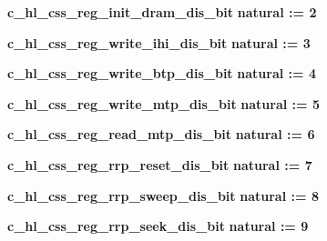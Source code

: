 \begin{DoxyCompactItemize}
\item 
{\bf c\+\_\+hl\+\_\+css\+\_\+reg\+\_\+init\+\_\+dram\+\_\+dis\+\_\+bit} {\bfseries \textcolor{comment}{natural}\textcolor{vhdlchar}{ }\textcolor{vhdlchar}{ }\textcolor{vhdlchar}{\+:}\textcolor{vhdlchar}{=}\textcolor{vhdlchar}{ }\textcolor{vhdlchar}{ } \textcolor{vhdldigit}{2} \textcolor{vhdlchar}{ }} 
\item 
{\bf c\+\_\+hl\+\_\+css\+\_\+reg\+\_\+write\+\_\+ihi\+\_\+dis\+\_\+bit} {\bfseries \textcolor{comment}{natural}\textcolor{vhdlchar}{ }\textcolor{vhdlchar}{ }\textcolor{vhdlchar}{\+:}\textcolor{vhdlchar}{=}\textcolor{vhdlchar}{ }\textcolor{vhdlchar}{ } \textcolor{vhdldigit}{3} \textcolor{vhdlchar}{ }} 
\item 
{\bf c\+\_\+hl\+\_\+css\+\_\+reg\+\_\+write\+\_\+btp\+\_\+dis\+\_\+bit} {\bfseries \textcolor{comment}{natural}\textcolor{vhdlchar}{ }\textcolor{vhdlchar}{ }\textcolor{vhdlchar}{\+:}\textcolor{vhdlchar}{=}\textcolor{vhdlchar}{ }\textcolor{vhdlchar}{ } \textcolor{vhdldigit}{4} \textcolor{vhdlchar}{ }} 
\item 
{\bf c\+\_\+hl\+\_\+css\+\_\+reg\+\_\+write\+\_\+mtp\+\_\+dis\+\_\+bit} {\bfseries \textcolor{comment}{natural}\textcolor{vhdlchar}{ }\textcolor{vhdlchar}{ }\textcolor{vhdlchar}{\+:}\textcolor{vhdlchar}{=}\textcolor{vhdlchar}{ }\textcolor{vhdlchar}{ } \textcolor{vhdldigit}{5} \textcolor{vhdlchar}{ }} 
\item 
{\bf c\+\_\+hl\+\_\+css\+\_\+reg\+\_\+read\+\_\+mtp\+\_\+dis\+\_\+bit} {\bfseries \textcolor{comment}{natural}\textcolor{vhdlchar}{ }\textcolor{vhdlchar}{ }\textcolor{vhdlchar}{\+:}\textcolor{vhdlchar}{=}\textcolor{vhdlchar}{ }\textcolor{vhdlchar}{ } \textcolor{vhdldigit}{6} \textcolor{vhdlchar}{ }} 
\item 
{\bf c\+\_\+hl\+\_\+css\+\_\+reg\+\_\+rrp\+\_\+reset\+\_\+dis\+\_\+bit} {\bfseries \textcolor{comment}{natural}\textcolor{vhdlchar}{ }\textcolor{vhdlchar}{ }\textcolor{vhdlchar}{\+:}\textcolor{vhdlchar}{=}\textcolor{vhdlchar}{ }\textcolor{vhdlchar}{ } \textcolor{vhdldigit}{7} \textcolor{vhdlchar}{ }} 
\item 
{\bf c\+\_\+hl\+\_\+css\+\_\+reg\+\_\+rrp\+\_\+sweep\+\_\+dis\+\_\+bit} {\bfseries \textcolor{comment}{natural}\textcolor{vhdlchar}{ }\textcolor{vhdlchar}{ }\textcolor{vhdlchar}{\+:}\textcolor{vhdlchar}{=}\textcolor{vhdlchar}{ }\textcolor{vhdlchar}{ } \textcolor{vhdldigit}{8} \textcolor{vhdlchar}{ }} 
\item 
{\bf c\+\_\+hl\+\_\+css\+\_\+reg\+\_\+rrp\+\_\+seek\+\_\+dis\+\_\+bit} {\bfseries \textcolor{comment}{natural}\textcolor{vhdlchar}{ }\textcolor{vhdlchar}{ }\textcolor{vhdlchar}{\+:}\textcolor{vhdlchar}{=}\textcolor{vhdlchar}{ }\textcolor{vhdlchar}{ } \textcolor{vhdldigit}{9} \textcolor{vhdlchar}{ }} 

\end{DoxyCompactItemize}
